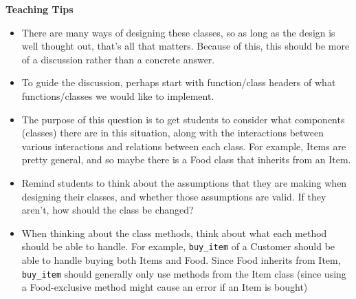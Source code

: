\begin{blocksection}
\begin{guide}
\textbf{Teaching Tips}
\begin{itemize}
    \item There are many ways of designing these classes, so as long as the design is well thought out, that's all that matters. Because of this, this should be more of a discussion rather than a concrete answer.
    \item To guide the discussion, perhaps start with function/class headers of what functions/classes we would like to implement.
    \item The purpose of this question is to get students to consider what components (classes) there are in this situation, along with the interactions between various interactions and relations between each class. For example, Items are pretty general, and so maybe there is a Food class that inherits from an Item.
    \item Remind students to think about the assumptions that they are making when designing their classes, and whether those assumptions are valid. If they aren't, how should the class be changed?
    \item When thinking about the class methods, think about what each method should be able to handle. For example, \lstinline{buy_item} of a Customer should be able to handle buying both Items and Food. Since Food inherits from Item, \lstinline{buy_item} should generally only use methods from the Item class (since using a Food-exclusive method might cause an error if an Item is bought)
\end{itemize}
\end{guide}
\end{blocksection}